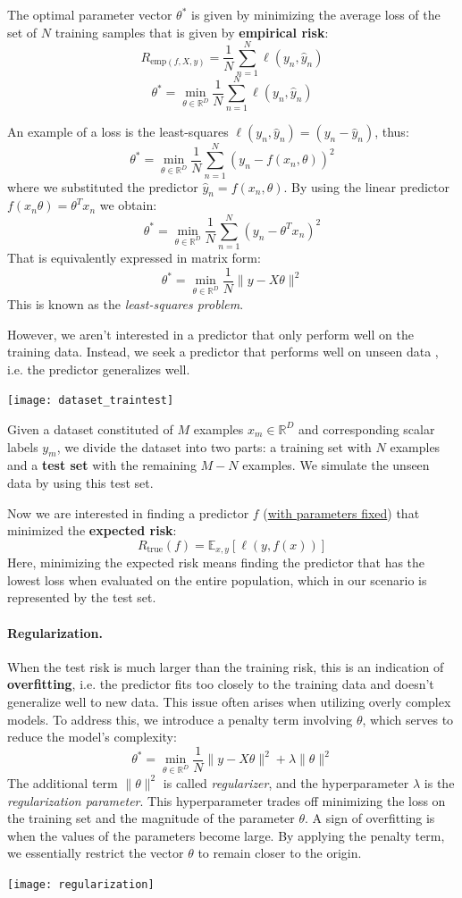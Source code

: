 \documentclass{article}
\begin{document}
The optimal parameter vector $\theta^*$ is given by minimizing the average
loss of the set of $N$ training samples that is given by \textbf{empirical
risk}:
$$R_{\text{emp}(f,X,y)}=\frac{1}{N}\sum^{N}_{n=1}\ell(y_n,\hat{y}_n)$$
$$\theta^*=\min_{\theta\in\mathbb{R}^D}\frac{1}{N}\sum^{N}_{n=1}\ell(y_n,\hat{y}_n)$$
\begin{example}
    An example of a loss is the least-squares
    $\ell(y_n,\hat{y}_n)=(y_n-\hat{y}_n)$, thus:
    $$\theta^*=\min_{\theta\in\mathbb{R}^D}\frac{1}{N}\sum^{N}_{n=1}(y_n-f(x_n,\theta))^2$$
    where we substituted the predictor $\hat{y}_n=f(x_n,\theta)$. By using the
    linear predictor $f(x_n\theta)=\theta^Tx_n$ we obtain:
    $$\theta^*=\min_{\theta\in\mathbb{R}^D}\frac{1}{N}\sum^{N}_{n=1}(y_n-\theta^Tx_n)^2$$
    That is equivalently expressed in matrix form: 
    $$\theta^*=\min_{\theta\in\mathbb{R}^D}\frac{1}{N}\lVert y-X\theta\rVert^2$$
    This is known as the \textit{least-squares problem}.
\end{example}
However, we aren't interested in a predictor that only perform well on the
training data. Instead, we seek a predictor that performs well on unseen data
, i.e. the predictor generalizes well.
\begin{center}
    \texttt{[image: dataset\_traintest]} 
\end{center}
Given a dataset constituted of $M$ examples $x_m\in \mathbb{R}^D$ and
corresponding scalar labels $y_m$, we divide the dataset into two parts: a
training set with $N$ examples and a \textbf{test set} with the remaining
$M-N$ examples. We simulate the unseen data by using this test set.

Now we are interested in finding a predictor $f$ (\underline{with parameters
fixed}) that minimized the \textbf{expected risk}:
$$R_{\text{true}}(f)=\mathbb{E}_{x,y}[\ell(y,f(x))]$$
Here, minimizing the expected risk means finding the predictor that has the
lowest loss when evaluated on the entire population, which in our scenario is
represented by the test set.
\paragraph{Regularization.}
When the test risk is much larger than the training risk, this is an
indication of \textbf{overfitting}, i.e. the predictor fits too closely to the
training data and doesn't generalize well to new data. This issue often arises
when utilizing overly complex models. To address this, we introduce a penalty
term involving $\theta$, which serves to reduce the model's complexity:
$$\theta^*=\min_{\theta\in\mathbb{R}^D}\frac{1}{N}\lVert
y-X\theta\rVert^2+\lambda \lVert \theta\rVert^2$$
The additional term $\lVert \theta\rVert^2$ is called \textit{regularizer},
and the hyperparameter $\lambda$ is the \textit{regularization parameter}.
This hyperparameter trades off minimizing the loss on the training set and the
magnitude of the parameter $\theta$. A sign of overfitting is when the values
of the parameters become large. By applying the penalty term, we essentially
restrict the vector $\theta$ to remain closer to the origin.
\begin{center}
    \texttt{[image: regularization]}
\end{center}
\end{document}
